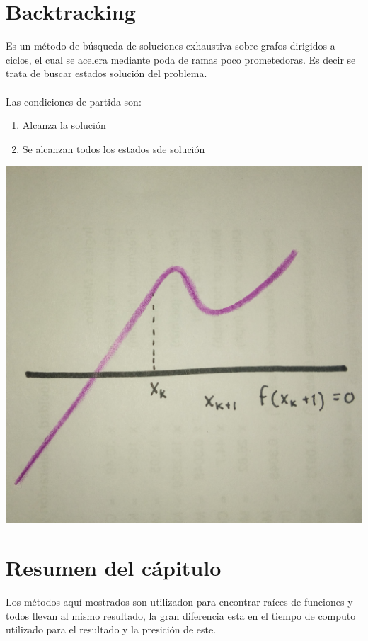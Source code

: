 \section*{Backtracking}
Es un m\'etodo de b\'usqueda de soluciones exhaustiva sobre grafos dirigidos a ciclos, el cual se acelera mediante poda de ramas poco prometedoras. Es decir se trata de buscar estados soluci\'on del problema. \\
\\
Las condiciones de partida son:
\begin{enumerate}
\item Alcanza la soluci\'on
\item Se alcanzan todos los estados sde soluci\'on
\end{enumerate}
\begin{center}
\includegraphics[scale=.05]{imagenes/5.jpg}
\end{center}

\section*{Resumen del c\'apitulo}
Los m\'etodos aqu\'i mostrados son utilizadon para encontrar ra\'ices de funciones y todos llevan al mismo resultado, la gran diferencia esta en el tiempo de computo utilizado para el resultado y la presici\'on de este.\\
\\
